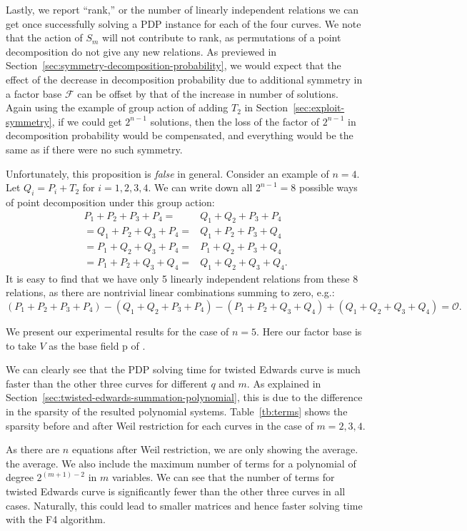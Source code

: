 Lastly, we report ``rank,'' or the number of linearly independent
relations we can get once successfully solving a PDP instance for each
of the four curves.
%
We note that the action of $S_m$ will not contribute to rank, as
permutations of a point decomposition do not give any new relations.
%
As previewed in Section~\ref{sec:symmetry-decomposition-probability},
we would expect that the effect of the decrease in decomposition
probability due to additional symmetry in a factor base $\mathcal F$
can be offset by that of the increase in number of solutions.
%
Again using the example of group action of adding $T_2$ in
Section~\ref{sec:exploit-symmetry}, if we could get $2^{n-1}$
solutions, then the loss of the factor of $2^{n-1}$ in decomposition
probability would be compensated, and everything would be the same as
if there were no such symmetry.

Unfortunately, this proposition is \emph{false} in general.
%
Consider an example of $n=4$.
%
Let $Q_i=P_i+ T_2$ for $i=1,2,3,4$.
%
We can write down all $2^{n-1}=8$ possible ways of point decomposition
under this group action:
%
\[ \begin{aligned}
P_1 + P_2 + P_3 + P_4 = & Q_1 + Q_2 + P_3 + P_4 \\
= Q_1 + P_2 + Q_3 + P_4 = & Q_1 + P_2 + P_3 + Q_4 \\
= P_1 + Q_2 + Q_3 + P_4 = & P_1 + Q_2 + P_3 + Q_4 \\
= P_1 + P_2 + Q_3 + Q_4 = & Q_1 + Q_2 + Q_3 + Q_4.
\end{aligned} \]
%
It is easy to find that we have only 5 linearly independent relations
from these 8 relations, as there are nontrivial linear combinations
summing to zero, e.g.:
\[ (P_1 + P_2 + P_3 + P_4) - (Q_1 + Q_2 + P_3 + P_4) - (P_1 + P_2 +
  Q_3 + Q_4) + (Q_1 + Q_2 + Q_3 + Q_4) = \mathcal O.\]

We present our experimental results for the case of $n=5$.
%
Here our factor base is to take $V$ as the base field \F p of .
%


We can clearly see that the PDP solving time for twisted Edwards curve
is much faster than the other three curves for different $q$ and $m$.
%
As explained in
Section~\ref{sec:twisted-edwards-summation-polynomial}, this is due to
the difference in the sparsity of the resulted polynomial systems.
%
Table~\ref{tb:terms} shows the sparsity before and after Weil
restriction for each curves in the case of $m=2,3,4$.
%

%
As there are $n$ equations after Weil restriction, we are only showing
the average.  the average.
%
We also include the maximum number of terms for a polynomial of degree
$2^{(m+1)-2}$ in $m$ variables.
%
We can see that the number of terms for twisted Edwards curve is
significantly fewer than the other three curves in all cases.
%
Naturally, this could lead to smaller matrices and hence faster
solving time with the F4 algorithm.

